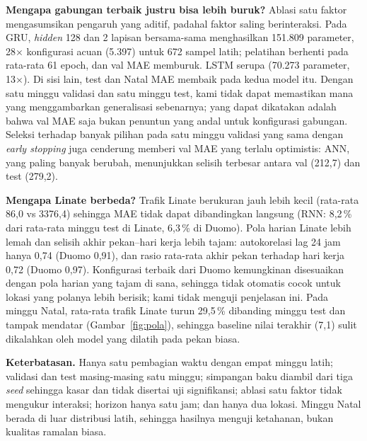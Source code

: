 \documentclass[10pt,twocolumn,a4paper]{article}
\begin{document}
\textbf{Mengapa gabungan terbaik justru bisa lebih buruk?} Ablasi satu faktor mengasumsikan pengaruh yang aditif, padahal faktor saling berinteraksi. Pada GRU, \textit{hidden} 128 dan 2 lapisan bersama-sama menghasilkan 151.809 parameter, 28$\times$ konfigurasi acuan (5.397) untuk 672 sampel latih; pelatihan berhenti pada rata-rata 61 epoch, dan val MAE memburuk. LSTM serupa (70.273 parameter, 13$\times$). Di sisi lain, test dan Natal MAE membaik pada kedua model itu. Dengan satu minggu validasi dan satu minggu test, kami tidak dapat memastikan mana yang menggambarkan generalisasi sebenarnya; yang dapat dikatakan adalah bahwa val MAE saja bukan penuntun yang andal untuk konfigurasi gabungan. Seleksi terhadap banyak pilihan pada satu minggu validasi yang sama dengan \textit{early stopping} juga cenderung memberi val MAE yang terlalu optimistis: ANN, yang paling banyak berubah, menunjukkan selisih terbesar antara val (212,7) dan test (279,2).

\textbf{Mengapa Linate berbeda?} Trafik Linate berukuran jauh lebih kecil (rata-rata 86,0 vs 3376,4) sehingga MAE tidak dapat dibandingkan langsung (RNN: 8,2\,\% dari rata-rata minggu test di Linate, 6,3\,\% di Duomo). Pola harian Linate lebih lemah dan selisih akhir pekan--hari kerja lebih tajam: autokorelasi lag 24 jam hanya 0,74 (Duomo 0,91), dan rasio rata-rata akhir pekan terhadap hari kerja 0,72 (Duomo 0,97). Konfigurasi terbaik dari Duomo kemungkinan disesuaikan dengan pola harian yang tajam di sana, sehingga tidak otomatis cocok untuk lokasi yang polanya lebih berisik; kami tidak menguji penjelasan ini. Pada minggu Natal, rata-rata trafik Linate turun 29,5\,\% dibanding minggu test dan tampak mendatar (Gambar~\ref{fig:pola}), sehingga baseline nilai terakhir (7,1) sulit dikalahkan oleh model yang dilatih pada pekan biasa.

\textbf{Keterbatasan.} Hanya satu pembagian waktu dengan empat minggu latih; validasi dan test masing-masing satu minggu; simpangan baku diambil dari tiga \textit{seed} sehingga kasar dan tidak disertai uji signifikansi; ablasi satu faktor tidak mengukur interaksi; horizon hanya satu jam; dan hanya dua lokasi. Minggu Natal berada di luar distribusi latih, sehingga hasilnya menguji ketahanan, bukan kualitas ramalan biasa.

\end{document}
